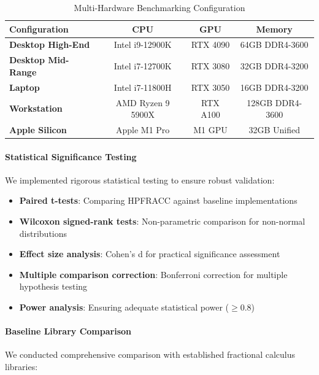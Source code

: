 \begin{table}[h]
\centering
\caption{Multi-Hardware Benchmarking Configuration}
\label{tab:hardware_config}
\begin{tabular}{lccc}
\toprule
Configuration & CPU & GPU & Memory \\
\midrule
\textbf{Desktop High-End} & Intel i9-12900K & RTX 4090 & 64GB DDR4-3600 \\
\textbf{Desktop Mid-Range} & Intel i7-12700K & RTX 3080 & 32GB DDR4-3200 \\
\textbf{Laptop} & Intel i7-11800H & RTX 3050 & 16GB DDR4-3200 \\
\textbf{Workstation} & AMD Ryzen 9 5900X & RTX A100 & 128GB DDR4-3600 \\
\textbf{Apple Silicon} & Apple M1 Pro & M1 GPU & 32GB Unified \\
\bottomrule
\end{tabular}
\end{table}

\paragraph{Statistical Significance Testing}

We implemented rigorous statistical testing to ensure robust validation:

\begin{itemize}
\item \textbf{Paired t-tests}: Comparing HPFRACC against baseline implementations
\item \textbf{Wilcoxon signed-rank tests}: Non-parametric comparison for non-normal distributions
\item \textbf{Effect size analysis}: Cohen's d for practical significance assessment
\item \textbf{Multiple comparison correction}: Bonferroni correction for multiple hypothesis testing
\item \textbf{Power analysis}: Ensuring adequate statistical power ($\geq 0.8$)
\end{itemize}

\paragraph{Baseline Library Comparison}

We conducted comprehensive comparison with established fractional calculus libraries:

